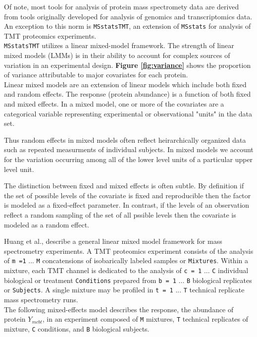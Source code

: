 \documentclass[11pt]{elife}\usepackage[]{graphicx}\usepackage[]{color}
\begin{document}
Of note, most tools for analysis of protein mass spectromety data are derived
from tools originally developed for analysis of genomics and transcriptomics
data. An exception to this norm is \texttt{MSstatsTMT}, an extension of 
\texttt{MSstats} for analysis of TMT proteomics experiments. \\

\texttt{MSstatsTMT} utilizes a linear mixed-model framework. The strength of 
linear mixed models (LMMs) is in their ability to account for complex sources of 
variation in an experimental design. \textbf{Figure \ref{fig:variance}} shows
the proportion of variance attributable to major covariates for each protein. \\

Linear mixed models are an extension of linear models which include both
fixed and random effects. 
The response (protein abundance) is a function of both fixed and mixed effects.
In a mixed model, one or more of the covariates are a categorical variable 
representing experimental or observational "units" in the data set. 

Thus random effects in mixed models often reflect heirarchically organized data 
such as repeated measurments of individual subjects. 
In mixed models we account for the variation occurring among all of the 
lower level units of a particular upper level unit.

The distinction between fixed and mixed effects is often subtle. By definition
if the set of possible levels of the covariate is fixed and reproducible then
the factor is modeled as a fixed-effect parameter. In contrast, if the levels of
an observation reflect a random sampling of the set of all pssible levels then
the covariate is modeled as a random effect. 

Huang et al., describe a general linear mixed model framework for mass 
spectrometry experiments. A TMT proteomics experiment consists of the analysis of 
\texttt{m =1} ... \texttt{M} concatensions of isobarically labeled samples 
or \texttt{Mixtures}. Within a mixture, each TMT channel is dedicated to the 
analysis of \texttt{c = 1} ... \texttt{C} individual biological or treatment 
\texttt{Conditions} prepared from \texttt{b = 1} ... \texttt{B} biological 
replicates or \texttt{Subjects}. A single mixture may be profiled in 
\texttt{t = 1} ... \texttt{T} technical replicate mass spectrometry runs.  \\

The following mixed-effects model describes the response, the abundance of 
protein $Y_{mcbt}$, in an experiment composed of \texttt{M} mixtures, \texttt{T} 
technical replicates of mixture, \texttt{C} conditions, and \texttt{B} biological subjects. 
\end{document}
